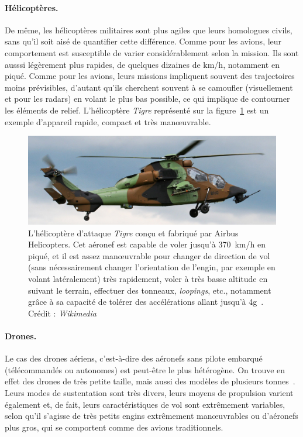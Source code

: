 	
	\paragraph{Hélicoptères.}
	De même, les hélicoptères militaires sont plus agiles que leurs homologues civils, sans qu'il soit aisé de quantifier cette différence. Comme pour les avions, leur comportement est susceptible de varier considérablement selon la mission. Ils sont ausssi légèrement plus rapides, de quelques dizaines de km/h, notamment en piqué. Comme pour les avions, leurs missions impliquent souvent des trajectoires moins prévisibles, d'autant qu'ils cherchent souvent à se camoufler (visuellement et pour les radars) en volant le plus bas possible, ce qui implique de contourner les éléments de relief. L'hélicoptère \emph{Tigre} représenté sur la figure~\ref{fig:tigre} est un exemple d'appareil rapide, compact et très manœuvrable.
	
	\begin{figure}[H]
		\centering
		\includegraphics[width=\textwidth]{figures/ch1/tigre}
		\caption[Hélicoptère d'attaque \emph{Tigre}.]{L'hélicoptère d'attaque \emph{Tigre} conçu et fabriqué par Airbus Helicopters. Cet aéronef est capable de voler jusqu'à 370~km/h en piqué, et il est assez manœuvrable pour changer de direction de vol (sans nécessairement changer l'orientation de l'engin, par exemple en volant latéralement) très rapidement, voler à très basse altitude en suivant le terrain, effectuer des tonneaux, \emph{loopings}, etc., notamment grâce à sa capacité de tolérer des accélérations allant jusqu'à 4g~\cite{tigre}. Crédit : \emph{Wikimedia}}
		\label{fig:tigre}
	\end{figure}
	
	\paragraph{Drones.}
	Le cas des drones aériens, c'est-à-dire des aéronefs sans pilote embarqué (télécommandés ou autonomes) est peut-être le plus hétérogène. On trouve en effet des drones de très petite taille, mais aussi des modèles de plusieurs tonnes~\footnotemark. Leurs modes de sustentation sont très divers, leurs moyens de propulsion varient également et, de fait, leurs caractéristiques de vol sont extrêmement variables, selon qu'il s'agisse de très petits engins extrêmement manœuvrables ou d'aéronefs plus gros, qui se comportent comme des avions traditionnels.

